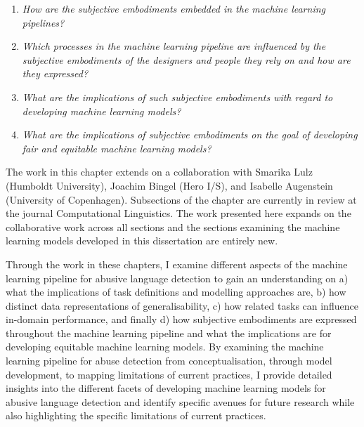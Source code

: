 \begin{center}
\begin{minipage}{0.9\textwidth}
\vspace{5mm}
    \begin{enumerate}[start=10, label={\textbf{RQ \arabic*}}]
        \item{\textit{How are the subjective embodiments embedded in the machine learning pipelines?}}
        \item{\textit{Which processes in the machine learning pipeline are influenced by the subjective embodiments of the designers and people they rely on and how are they expressed?}}
        \item{\textit{What are the implications of such subjective embodiments with regard to developing machine learning models?}}
        \item{\textit{What are the implications of subjective embodiments on the goal of developing fair and equitable machine learning models?}}
    \end{enumerate}
\vspace{5mm}
\end{minipage}
\end{center}


The work in this chapter extends on a collaboration with Smarika Lulz (Humboldt University), Joachim Bingel (Hero I/S), and Isabelle Augenstein (University of Copenhagen). Subsections of the chapter are currently in review at the journal Computational Linguistics.
The work presented here expands on the collaborative work across all sections and the sections examining the machine learning models developed in this dissertation are entirely new.
\vspace{5mm}

Through the work in these chapters, I examine different aspects of the machine learning pipeline for abusive language detection to gain an understanding on a) what the implications of task definitions and modelling approaches are, b) how distinct data representations of generalisability, c) how related tasks can influence in-domain performance, and finally d) how subjective embodiments are expressed throughout the machine learning pipeline and what the implications are for developing equitable machine learning models.
By examining the machine learning pipeline for abuse detection from conceptualisation, through model development, to mapping limitations of current practices, I provide detailed insights into the different facets of developing machine learning models for abusive language detection and identify specific avenues for future research while also highlighting the specific limitations of current practices.

